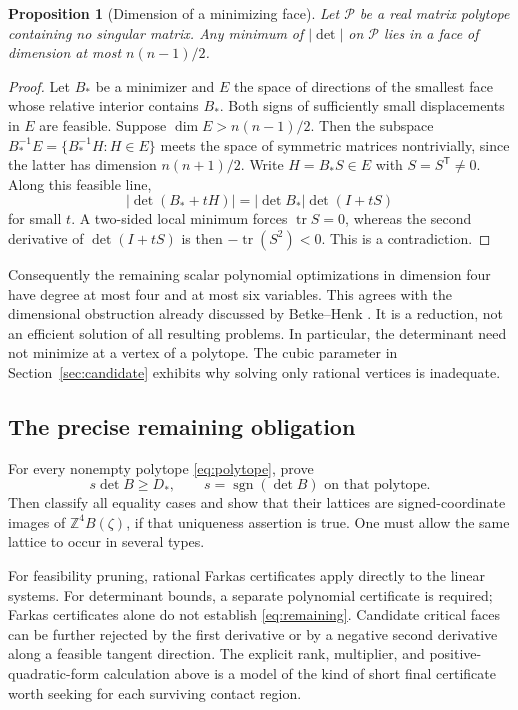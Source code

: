 \documentclass[11pt,reqno]{amsart}
\newtheorem{proposition}[theorem]{Proposition}
\theoremstyle{definition}
\newcommand{\Z}{\mathbb Z}
\newcommand{\tr}{\operatorname{tr}}
\newcommand{\sgn}{\operatorname{sgn}}
\newcommand{\Dnew}{D_*}
\begin{document}
\begin{proposition}[Dimension of a minimizing face]\label{prop:face-dim}
Let $\mathcal P$ be a real matrix polytope containing no singular matrix.
Any minimum of $|\det|$ on $\mathcal P$ lies in a face of dimension at
most $n(n-1)/2$.
\end{proposition}
\begin{proof}
Let $B_*$ be a minimizer and $E$ the space of directions of the smallest
face whose relative interior contains $B_*$. Both signs of sufficiently
small displacements in $E$ are feasible. Suppose
$\dim E>n(n-1)/2$. Then the subspace
$B_*^{-1}E=\{B_*^{-1}H:H\in E\}$ meets the space of symmetric matrices
nontrivially, since the latter has dimension $n(n+1)/2$. Write
$H=B_*S\in E$ with $S=S^{\mathsf T}\ne0$.
Along this feasible line,
\[
 |\det(B_*+tH)|=|\det B_*|\det(I+tS)
\]
for small $t$. A two-sided local minimum forces $\tr S=0$, whereas
the second derivative of $\det(I+tS)$ is then
$-\tr(S^2)<0$. This is a contradiction.
\end{proof}

Consequently the remaining scalar polynomial optimizations in
dimension four have degree at most four and at most six variables.
This agrees with the dimensional obstruction already discussed by
Betke--Henk \cite[Section 2, pp. 7--8 of the preprint]{BetkeHenk}.
It is a reduction, not an efficient solution of all resulting problems.
In particular, the determinant need not minimize at a vertex of a
polytope. The cubic parameter in Section~\ref{sec:candidate} exhibits
why solving only rational vertices is inadequate.

\subsection{The precise remaining obligation}
For every nonempty polytope \eqref{eq:polytope}, prove
\begin{equation}\label{eq:remaining}
 s\det B\ge \Dnew,\qquad
 s=\sgn(\det B)\text{ on that polytope}.
\end{equation}
Then classify all equality cases and show that their lattices are
signed-coordinate images of $\Z^4B(\zeta)$, if that uniqueness assertion
is true. One must allow the same lattice to occur in several types.

For feasibility pruning, rational Farkas certificates apply directly
to the linear systems. For determinant bounds, a separate polynomial
certificate is required; Farkas certificates alone do not establish
\eqref{eq:remaining}. Candidate critical faces can be further rejected
by the first derivative or by a negative second derivative along a
feasible tangent direction. The explicit rank, multiplier, and
positive-quadratic-form calculation above is a model of the kind of
short final certificate worth seeking for each surviving contact region.
\end{document}
